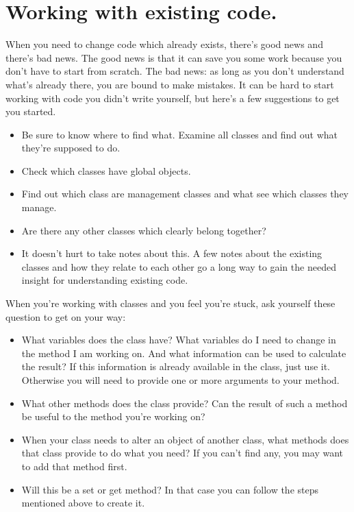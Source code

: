 \section{Working with existing code.}
When you need to change code which already exists, there's good news and there's bad news. The good news is that it can save you some work because you don't have to start from scratch. The bad news: as long as you don't understand what's already there, you are bound to make mistakes. It can be hard to start working with code you didn't write yourself, but here's a few suggestions to get you started.

\begin{itemize}
\item Be sure to know where to find what. Examine all classes and find out what they're supposed to do.
\item Check which classes have global objects.
\item Find out which class are management classes and what see which classes they manage.
\item Are there any other classes which clearly belong together?
\item It doesn't hurt to take notes about this. A few notes about the existing classes and how they relate to each other go a long way to gain the needed insight for understanding existing code.
\end{itemize}

When you're working with classes and you feel you're stuck, ask yourself these question to get on your way:
\begin{itemize}
\item What variables does the class have? What variables do I need to change in the method I am working on. And what information can be used to calculate the result? If this information is already available in the class, just use it. Otherwise you will need to provide one or more arguments to your method.
\item What other methods does the class provide? Can the result of such a method be useful to the method you're working on?
\item When your class needs to alter an object of another class, what methods does that class provide to do what you need? If you can't find any, you may want to add that method first.
\item Will this be a set or get method? In that case you can follow the steps mentioned above to create it.
\end{itemize}







